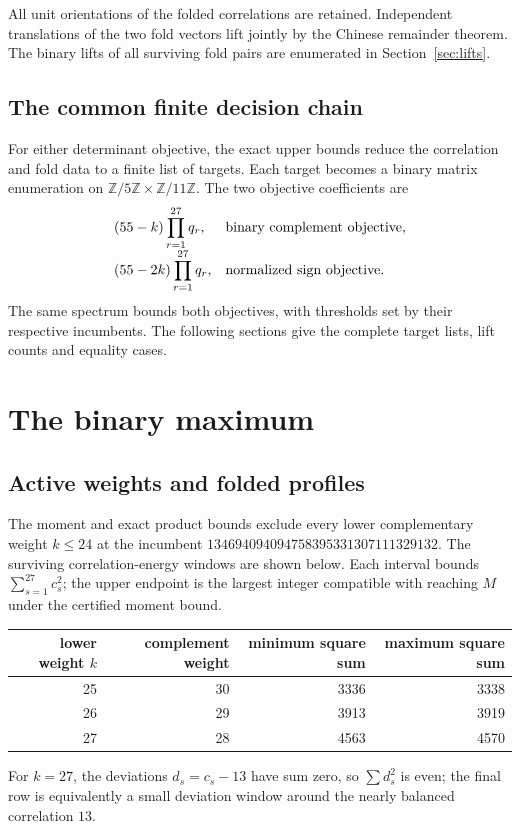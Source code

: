 \documentclass[11pt,a4paper]{article}
\theoremstyle{remark}
\newcommand{\M}{134694094094758395331307111329132}
\begin{document}
All unit orientations of the folded correlations are retained.  Independent
translations of the two fold vectors lift jointly by the Chinese remainder
theorem.  The binary lifts of all surviving fold pairs are enumerated in
Section~\ref{sec:lifts}.

\subsection{The common finite decision chain}

For either determinant objective, the exact upper bounds reduce
the correlation and fold data to a finite list of targets.
Each target becomes a binary matrix enumeration on
$\mathbb Z/5\mathbb Z\times\mathbb Z/11\mathbb Z$.
The two objective coefficients are
\[
 \begin{array}{ll}
 (55-k)\displaystyle\prod_{r=1}^{27}q_r,
   &\hbox{binary complement objective},\\[4pt]
 (55-2k)\displaystyle\prod_{r=1}^{27}q_r,
   &\hbox{normalized sign objective}.
 \end{array}
\]
The same spectrum bounds both objectives, with thresholds set by
their respective incumbents.  The following sections give the
complete target lists, lift counts and equality cases.

\section{The binary maximum}\label{sec:binary}

\subsection{Active weights and folded profiles}

The moment and exact product bounds exclude every lower
complementary weight $k\le24$ at the incumbent $\M$.
The surviving correlation-energy windows are shown below.
Each interval bounds $\sum_{s=1}^{27}c_s^2$; the upper endpoint is
the largest integer compatible with reaching $M$ under the
certified moment bound.
\begin{center}
\small
\begin{tabular}{@{}rrrr@{}}
\toprule
lower weight $k$ & complement weight & minimum square sum & maximum square sum\\
\midrule
25 & 30 & 3336 & 3338\\
26 & 29 & 3913 & 3919\\
27 & 28 & 4563 & 4570\\
\bottomrule
\end{tabular}
\end{center}
For $k=27$, the deviations $d_s=c_s-13$ have sum zero, so
$\sum d_s^2$ is even; the final row is equivalently a small deviation
window around the nearly balanced correlation $13$.
\end{document}
